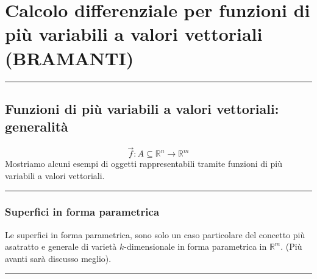\section*{Calcolo differenziale per funzioni di più variabili a valori vettoriali (BRAMANTI)}
\rule{\textwidth}{2pt}
\subsection*{Funzioni di più variabili a valori vettoriali: generalità}
\[
    \vec{f}: A\subseteq \mathbb{R}^n \rightarrow  \mathbb{R}^m
\]
Mostriamo alcuni esempi di oggetti rappresentabili tramite funzioni di più variabili a valori vettoriali.\newline
\rule{\textwidth}{0,4pt}
\subsubsection*{Superfici in forma parametrica}
Le superfici in forma parametrica, sono solo un caso particolare del concetto più asatratto e generale di varietà $k$-dimensionale in forma parametrica in $\mathbb{R}^m$. (Più avanti sarà discusso meglio).\newline
\rule{\textwidth}{0,4pt}
